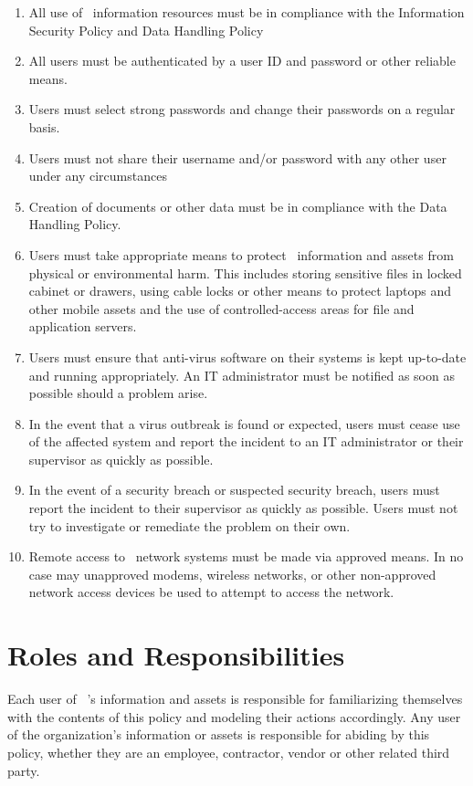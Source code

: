 \documentclass[use]{policy}
\begin{document}
	\begin{enumerate}[label=\Alph*.]
		\item All use of \theOrganization\  information resources must be in compliance with the Information Security Policy and Data Handling Policy
		\item All users must be authenticated by a user ID and password or other reliable means.
		\item Users must select strong passwords and change their passwords on a regular basis.
		\item Users must not share their username and/or password with any other user under any circumstances
		\item Creation of documents or other data must be in compliance with the Data Handling Policy.
		\item Users must take appropriate means to protect \theOrganization\  information and assets from physical or environmental harm.  This includes storing sensitive files in locked cabinet or drawers, using cable locks or other means to protect laptops and other mobile assets and the use of controlled-access areas for file and application servers.
		\item Users must ensure that anti-virus software on their systems is kept up-to-date and running appropriately.  An IT administrator must be notified as soon as possible should a problem arise.
	 	\item In the event that a virus outbreak is found or expected, users must cease use of the affected system and report the incident to an IT administrator or their supervisor as quickly as possible.
		\item In the event of a security breach or suspected security breach, users must report the incident to their supervisor as quickly as possible.  Users must not try to investigate or remediate the problem on their own.
		\item Remote access to \theOrganization\  network systems must be made via approved means.  In no case may unapproved modems, wireless networks, or other non-approved network access devices be used to attempt to access the network.
	\end{enumerate}
	
	
	\section{Roles and Responsibilities}
	
		Each user of \theOrganization\ ’s information and assets is responsible for familiarizing themselves with the contents of this policy and modeling their actions accordingly.  Any user of the organization’s information or assets is responsible for abiding by this policy, whether they are an employee, contractor, vendor or other related third party.
	
\end{document}
